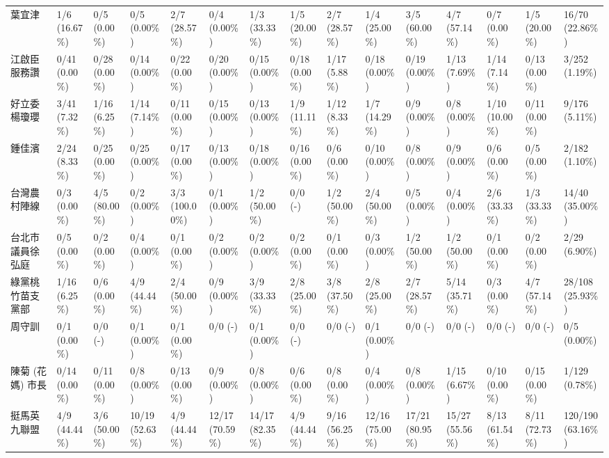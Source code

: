 \documentclass[a4paper, 10pt, conference]{ieeeconf}       %
\begin{document}
\begin{CJK}{UTF8}{bsmi}
\begin{landscape}
\begin{longtable}[c]{@{}L{2.45cm}L{1.1cm}L{1.1cm}L{1.1cm}L{1.1cm}L{1.1cm}L{1.1cm}L{1.1cm}L{1.1cm}L{1.1cm}L{1.1cm}L{1.1cm}L{1.1cm}L{1.1cm}L{1.1cm}@{}}
葉宜津 & 1/6 (16.67\%) & 0/5 (0.00\%) & 0/5 (0.00\%) & 2/7 (28.57\%) & 0/4 (0.00\%) & 1/3 (33.33\%) & 1/5 (20.00\%) & 2/7 (28.57\%) & 1/4 (25.00\%) & 3/5 (60.00\%) & 4/7 (57.14\%) & 0/7 (0.00\%) & 1/5 (20.00\%) & 16/70 (22.86\%) \\
江啟臣服務讚 & 0/41 (0.00\%) & 0/28 (0.00\%) & 0/14 (0.00\%) & 0/22 (0.00\%) & 0/20 (0.00\%) & 0/15 (0.00\%) & 0/18 (0.00\%) & 1/17 (5.88\%) & 0/18 (0.00\%) & 0/19 (0.00\%) & 1/13 (7.69\%) & 1/14 (7.14\%) & 0/13 (0.00\%) & 3/252 (1.19\%) \\
好立委 楊瓊瓔 & 3/41 (7.32\%) & 1/16 (6.25\%) & 1/14 (7.14\%) & 0/11 (0.00\%) & 0/15 (0.00\%) & 0/13 (0.00\%) & 1/9 (11.11\%) & 1/12 (8.33\%) & 1/7 (14.29\%) & 0/9 (0.00\%) & 0/8 (0.00\%) & 1/10 (10.00\%) & 0/11 (0.00\%) & 9/176 (5.11\%) \\
鍾佳濱 & 2/24 (8.33\%) & 0/25 (0.00\%) & 0/25 (0.00\%) & 0/17 (0.00\%) & 0/13 (0.00\%) & 0/18 (0.00\%) & 0/16 (0.00\%) & 0/6 (0.00\%) & 0/10 (0.00\%) & 0/8 (0.00\%) & 0/9 (0.00\%) & 0/6 (0.00\%) & 0/5 (0.00\%) & 2/182 (1.10\%) \\
台灣農村陣線 & 0/3 (0.00\%) & 4/5 (80.00\%) & 0/2 (0.00\%) & 3/3 (100.00\%) & 0/1 (0.00\%) & 1/2 (50.00\%) & 0/0 (-) & 1/2 (50.00\%) & 2/4 (50.00\%) & 0/5 (0.00\%) & 0/4 (0.00\%) & 2/6 (33.33\%) & 1/3 (33.33\%) & 14/40 (35.00\%) \\
台北市議員徐弘庭 & 0/5 (0.00\%) & 0/2 (0.00\%) & 0/4 (0.00\%) & 0/1 (0.00\%) & 0/2 (0.00\%) & 0/2 (0.00\%) & 0/2 (0.00\%) & 0/1 (0.00\%) & 0/3 (0.00\%) & 1/2 (50.00\%) & 1/2 (50.00\%) & 0/1 (0.00\%) & 0/2 (0.00\%) & 2/29 (6.90\%) \\
綠黨桃竹苗支黨部 & 1/16 (6.25\%) & 0/6 (0.00\%) & 4/9 (44.44\%) & 2/4 (50.00\%) & 0/9 (0.00\%) & 3/9 (33.33\%) & 2/8 (25.00\%) & 3/8 (37.50\%) & 2/8 (25.00\%) & 2/7 (28.57\%) & 5/14 (35.71\%) & 0/3 (0.00\%) & 4/7 (57.14\%) & 28/108 (25.93\%) \\
周守訓 & 0/1 (0.00\%) & 0/0 (-) & 0/1 (0.00\%) & 0/1 (0.00\%) & 0/0 (-) & 0/1 (0.00\%) & 0/0 (-) & 0/0 (-) & 0/1 (0.00\%) & 0/0 (-) & 0/0 (-) & 0/0 (-) & 0/0 (-) & 0/5 (0.00\%) \\
陳菊 (花媽) 市長 & 0/14 (0.00\%) & 0/11 (0.00\%) & 0/8 (0.00\%) & 0/13 (0.00\%) & 0/9 (0.00\%) & 0/8 (0.00\%) & 0/6 (0.00\%) & 0/8 (0.00\%) & 0/4 (0.00\%) & 0/8 (0.00\%) & 1/15 (6.67\%) & 0/10 (0.00\%) & 0/15 (0.00\%) & 1/129 (0.78\%) \\
挺馬英九聯盟 & 4/9 (44.44\%) & 3/6 (50.00\%) & 10/19 (52.63\%) & 4/9 (44.44\%) & 12/17 (70.59\%) & 14/17 (82.35\%) & 4/9 (44.44\%) & 9/16 (56.25\%) & 12/16 (75.00\%) & 17/21 (80.95\%) & 15/27 (55.56\%) & 8/13 (61.54\%) & 8/11 (72.73\%) & 120/190 (63.16\%) \\

\end{longtable}
\end{landscape}
\end{CJK}
\end{document}
